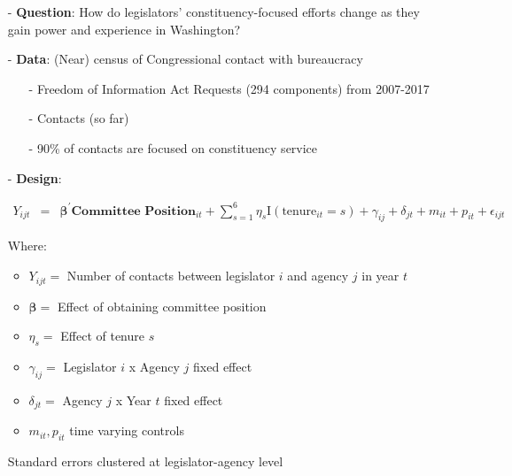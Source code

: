 \documentclass[xcolor=dvipsnames]{beamer}
\begin{document}


\begin{frame}

\large

\begin{itemize}
\item[-] \textbf{Question}: How do legislators' constituency-focused efforts change as they gain power and experience in Washington?   
\item[-] \textbf{Data}: (Near) census of Congressional contact with bureaucracy
\begin{itemize}
	\item[-]  Freedom of Information Act Requests (294 components) from 2007-2017 
	\item[-]  Contacts (so far)
	\item[-] 90\% of contacts are focused on constituency service
\end{itemize} 
\item[-] \textbf{Design}:
\begin{footnotesize} 
\begin{eqnarray}
Y_{ijt} & = & \boldsymbol{\beta}^{'} \textbf{Committee Position}_{it}   + \sum_{s = 1}^{6} \eta_{s} \text{I}\left(\text{tenure}_{it} = s\right) + \gamma_{ij} +  \delta_{jt} +  m_{it} + p_{it} +  \epsilon_{ijt} \nonumber 
\end{eqnarray}
\end{footnotesize}
Where: 
\begin{itemize}
	\item  $Y_{ijt} = $ Number of contacts between legislator $i$ and agency $j$ in year $t$
	\item $\boldsymbol{\beta} = $ Effect of obtaining committee position
	\item $\eta_{s} = $ Effect of tenure $s$ 
	\item  $\gamma_{ij} = $ Legislator $i$ x Agency $j$ fixed effect 
	\item  $\delta_{jt} = $ Agency $j$ x Year $t$ fixed effect
	\item $m_{it}, p_{it}$ time varying controls 
\end{itemize}

Standard errors clustered at legislator-agency level 
\end{itemize}

\end{frame}

\begin{frame}

\begin{tiny}
\begin{center}

\end{center}
\end{tiny}

\end{frame}
\end{document}
